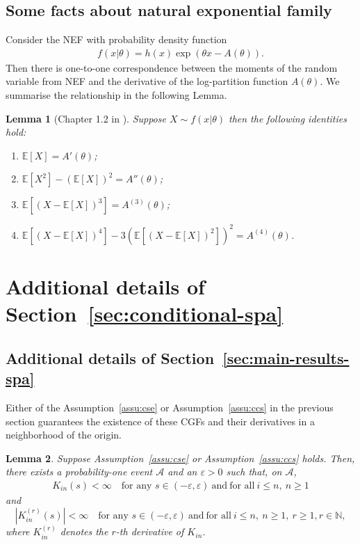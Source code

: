 \documentclass[12pt]{article}
\newtheorem{lemma}{Lemma}
\theoremstyle{definition}
\newcommand{\E}{\mathbb E}								%
\begin{document}
\subsection{Some facts about natural exponential family}

Consider the NEF with probability density function
\begin{align*}
  f(x|\theta)=h(x)\exp(\theta x-A(\theta)).
\end{align*}
Then there is one-to-one correspondence between the moments of the random variable from NEF and the derivative of the log-partition function $A(\theta)$. We summarise the relationship in the following Lemma.

\begin{lemma}[Chapter 1.2 in \cite{Efron2022}]\label{lem:moment_logpartition}
  Suppose $X\sim f(x|\theta)$ then the following identities hold:
  \begin{enumerate}
    \item $\E[X]=A'(\theta)$;
    \item $\E[X^2]-(\E[X])^2=A''(\theta)$;
    \item $\E[(X-\E[X])^3]=A^{(3)}(\theta)$;
    \item $\E[(X-\E[X])^4]-3\left(\E[(X-\E[X])^2]\right)^2=A^{(4)}(\theta)$.
  \end{enumerate}
\end{lemma}


\section{Additional details of Section~\ref{sec:conditional-spa}}

\subsection{Additional details of Section~\ref{sec:main-results-spa}}\label{sec:additional-details-spa}

Either of the Assumption~\ref{assu:cse} or Assumption~\ref{assu:ccs} in the previous section guarantees the existence of these CGFs and their derivatives in a neighborhood of the origin.
\begin{lemma}\label{lem:finite_cgf}
Suppose Assumption~\ref{assu:cse} or Assumption~\ref{assu:ccs} holds. Then, there exists a probability-one event $\mathcal A$ and an $\varepsilon > 0$ such that, on $\mathcal A$,
\begin{align}
K_{in}(s) < \infty\quad \text{for any } s\in (-\varepsilon,\varepsilon)\ \text{and}\ \text{for all}\ i \leq n,\ n \geq 1 \label{eq:finite_cgf}
\end{align}
and 
\begin{equation}\label{eq:finite_cgf_derivatives}
	|K_{in}^{(r)}(s)| < \infty\quad \text{for any } s\in (-\varepsilon,\varepsilon)\ \text{and}\ \text{for all}\ i \leq n,\ n \geq 1, \ r \geq 1, r\in\mathbb{N},
\end{equation}
where $K_{in}^{(r)}$ denotes the $r$-th derivative of $K_{in}$.
\end{lemma}
\end{document}
